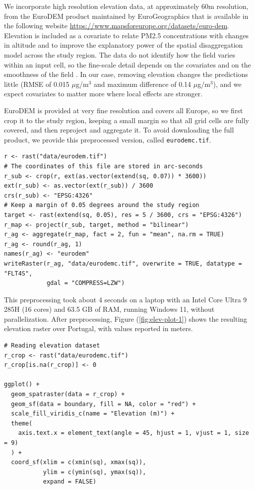We incorporate high resolution elevation data, at approximately \(60\)m resolution, from the EuroDEM product maintained by EuroGeographics \citep{eurogeographics2023eurodem} that is available in the following website \url{https://www.mapsforeurope.org/datasets/euro-dem}. Elevation is included as a covariate to relate PM2.5 concentrations with changes in altitude and to improve the explanatory power of the spatial disaggregation model across the study region. The data do not identify how the field varies within an input cell, so the fine-scale detail depends on the covariates and on the smoothness of the field \citep{suen2026coherent}. In our case, removing elevation changes the predictions little (RMSE of 0.015 \(\mu\)g/m\(^3\) and maximum difference of 0.14 \(\mu\)g/m\(^3\)), and we expect covariates to matter more where local effects are stronger.

EuroDEM is provided at very fine resolution and covers all Europe, so we first crop it to the study region, keeping a small margin so that all grid cells are fully covered, and then reproject and aggregate it. To avoid downloading the full product, we provide this preprocessed version, called \texttt{eurodemc.tif}.

\begin{verbatim}
r <- rast("data/eurodem.tif")
# The coordinates of this file are stored in arc-seconds
r_sub <- crop(r, ext(as.vector(extend(sq, 0.07)) * 3600))
ext(r_sub) <- as.vector(ext(r_sub)) / 3600
crs(r_sub) <- "EPSG:4326"
# Keep a margin of 0.05 degrees around the study region
target <- rast(extend(sq, 0.05), res = 5 / 3600, crs = "EPSG:4326")
r_map <- project(r_sub, target, method = "bilinear")
r_ag <- aggregate(r_map, fact = 2, fun = "mean", na.rm = TRUE)
r_ag <- round(r_ag, 1)
names(r_ag) <- "eurodem"
writeRaster(r_ag, "data/eurodemc.tif", overwrite = TRUE, datatype = "FLT4S",
            gdal = "COMPRESS=LZW")
\end{verbatim}

This preprocessing took about 4 seconds on a laptop with an Intel Core Ultra 9 285H (16 cores) and 63.5 GB of RAM, running Windows 11, without parallelization. After preprocessing, Figure (\ref{fig:elev-plot-1}) shows the resulting elevation raster over Portugal, with values reported in meters.

\begin{verbatim}
# Reading elevation dataset
r_crop <- rast("data/eurodemc.tif")
r_crop[is.na(r_crop)] <- 0

ggplot() +
  geom_spatraster(data = r_crop) +
  geom_sf(data = boundary, fill = NA, color = "red") +
  scale_fill_viridis_c(name = "Elevation (m)") +
  theme(
    axis.text.x = element_text(angle = 45, hjust = 1, vjust = 1, size = 9)
  ) +
  coord_sf(xlim = c(xmin(sq), xmax(sq)),
           ylim = c(ymin(sq), ymax(sq)),
           expand = FALSE)
\end{verbatim}

